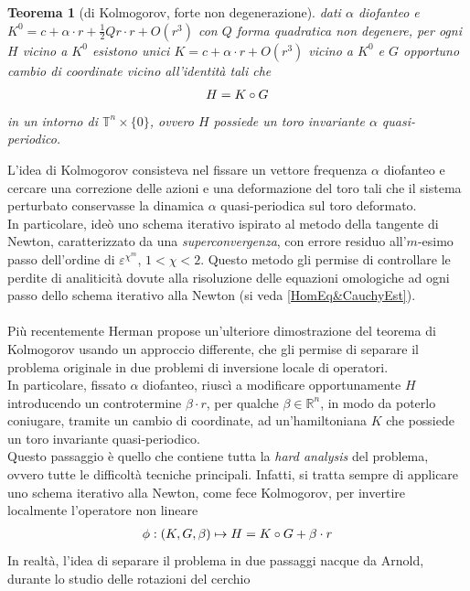 \documentclass[twoside, 11pt]{amsbook}
\newcommand{\0}{{(0)}}
\newcommand{\3}{{(3)}}
\theoremstyle{colonplain}
\newtheorem{thm}{Teorema}[chapter]
\theoremstyle{colondefinition}
\theoremstyle{colonremark}
\numberwithin{equation}{chapter}
\begin{document}
\begin{thm}[di Kolmogorov, forte non degenerazione]
dati $\alpha$ diofanteo e $K^0 = c + \alpha \cdot r + \frac{1}{2}Qr \cdot r + O(r^3)$ con $Q$ forma quadratica non degenere, per ogni $H$ vicino a $K^0$ esistono unici $K = c + \alpha \cdot r + O(r^3)$ vicino a $K^0$ e $G$ opportuno cambio di coordinate vicino all'identità tali che
\begin{align}
    H = K \circ G \notag
\end{align}
in un intorno di $\mathbb{T}^n \times \{0\}$, ovvero $H$ possiede un toro invariante $\alpha$ quasi-periodico.
\end{thm}
L'idea di Kolmogorov consisteva nel fissare un vettore frequenza $\alpha$ diofanteo e cercare una correzione delle azioni e una deformazione del toro tali che il sistema perturbato conservasse la dinamica $\alpha$ quasi-periodica sul toro deformato. \\
In particolare, ideò uno schema iterativo ispirato al metodo della tangente di Newton, caratterizzato da una \textit{superconvergenza}, con errore residuo all'$m$-esimo passo dell'ordine di $\varepsilon^{\chi^m}$, $1 < \chi < 2$. Questo metodo gli permise di controllare le perdite di analiticità dovute alla risoluzione delle equazioni omologiche ad ogni passo dello schema iterativo alla Newton (si veda \ref{HomEq&CauchyEst}). \\ \\
Più recentemente Herman propose un'ulteriore dimostrazione del teorema di Kolmogorov usando un approccio differente, che gli permise di separare il problema originale in due problemi di inversione locale di operatori. \\
In particolare, fissato $\alpha$ diofanteo, riuscì a modificare opportunamente $H$ introducendo un controtermine $\beta \cdot r$, per qualche $\beta \in \mathbb{R}^n$, in modo da poterlo coniugare, tramite un cambio di coordinate, ad un'hamiltoniana $K$ che possiede un toro invariante quasi-periodico. \\
Questo passaggio è quello che contiene tutta la \textit{hard analysis} del problema, ovvero tutte le difficoltà tecniche principali. Infatti, si tratta sempre di applicare uno schema iterativo alla Newton, come fece Kolmogorov, per invertire localmente l'operatore non lineare
\begin{align}
    \phi : (K, G, \beta) \mapsto H = K \circ G + \beta \cdot r \notag
\end{align}
In realtà, l'idea di separare il problema in due passaggi nacque da Arnold, durante lo studio delle rotazioni del cerchio
\end{document}
